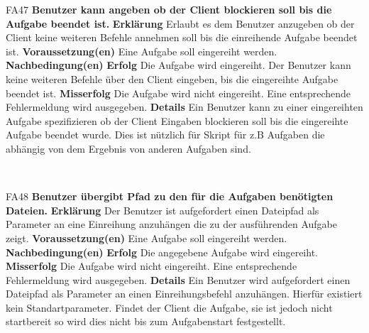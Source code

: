 \documentclass[a4paper,12pt]{article}
\begin{document}
\begin{itemize}[nosep]
	\begin{minipage}[t]{\linewidth}
		\item[FA47] \textbf{Benutzer kann angeben ob der \gls{Client} blockieren soll bis die Aufgabe beendet ist.}
		\subitem \textbf{Erklärung} Erlaubt es dem \gls{Benutzer} anzugeben ob der Client keine weiteren Befehle annehmen soll bis die einreihende Aufgabe beendet ist.
		\subitem \textbf{Voraussetzung(en)} Eine Aufgabe soll eingereiht werden.
		\subitem \textbf{Nachbedingung(en)}
		\subsubitem \textbf{Erfolg} Die Aufgabe wird eingereiht. Der Benutzer kann keine weiteren Befehle über den Client eingeben, bis die eingereihte Aufgabe beendet ist.
		\subsubitem \textbf{Misserfolg} Die Aufgabe wird nicht eingereiht. Eine entsprechende Fehlermeldung wird ausgegeben.
		\subitem \textbf{Details} Ein \gls{Benutzer} kann zu einer eingereihten Aufgabe spezifizieren ob der Client Eingaben blockieren soll bis die eingereihte Aufgabe beendet wurde. Dies ist nützlich für Skript für z.B Aufgaben die abhängig von dem Ergebnis von anderen Aufgaben sind.
	\end{minipage}
	\newline
	\\
	
	\begin{minipage}[t]{\linewidth}
		\item[FA48] \textbf{\gls{Benutzer} übergibt Pfad zu den für die Aufgaben benötigten Dateien.}
		\subitem \textbf{Erklärung} Der \gls{Benutzer} ist aufgefordert einen Dateipfad als Parameter an eine Einreihung anzuhängen die zu der ausführenden Aufgabe zeigt.
		\subitem \textbf{Voraussetzung(en)} Eine Aufgabe soll eingereiht werden.
		\subitem \textbf{Nachbedingung(en)}
		\subsubitem \textbf{Erfolg} Die angegebene Aufgabe wird eingereiht.
		\subsubitem \textbf{Misserfolg} Die Aufgabe wird nicht eingereiht. Eine entsprechende Fehlermeldung wird ausgegeben.
		\subitem \textbf{Details} Ein \gls{Benutzer} wird aufgefordert einen Dateipfad als Parameter an einen Einreihungsbefehl anzuhängen. Hierfür existiert kein Standartparameter. Findet der Client die Aufgabe, sie ist jedoch nicht startbereit so wird dies nicht bis zum Aufgabenstart festgestellt. %
	\end{minipage}
	\newline
	\\
	

\end{itemize}
\end{document}
